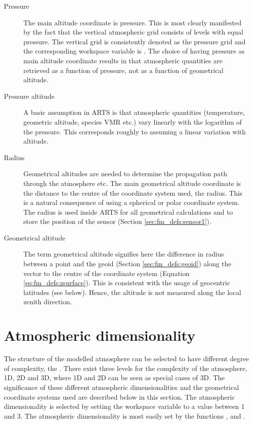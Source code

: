 \begin{description}
  
\item[Pressure] The main altitude coordinate is
  pressure. This is most clearly manifested by the fact that the
  vertical atmospheric grid consists of levels with equal pressure.
  The vertical grid is consistently denoted as the pressure grid and
  the corresponding workspace variable is . The
  choice of having pressure as main altitude coordinate results in
  that atmospheric quantities are retrieved as a function of pressure,
  not as a function of geometrical altitude.
  
\item[Pressure altitude] A basic assumption
  in ARTS is that atmospheric quantities (temperature, geometric
  altitude, species VMR etc.) vary linearly with the logarithm of the
  pressure. This corresponds roughly to assuming a linear variation
  with altitude. 

\item[Radius] Geometrical altitudes are
  needed to determine the propagation path through the atmosphere etc.
  The main geometrical altitude coordinate is the distance to the
  centre of the coordinate system used, the radius. This is a natural
  consequence of using a spherical or polar coordinate system. The
  radius is used inside ARTS for all geometrical calculations and to
  store the position of the sensor (Section 
  \ref{sec:fm_defs:sensor1}).
  
\item[Geometrical altitude] The term geometrical
  altitude signifies here the difference in radius between a point and the
  geoid (Section \ref{sec:fm_defs:geoid}) along the vector to the centre of the
  coordinate system (Equation \ref{eq:fm_defs:zsurface}). This is consistent
  with the usage of geocentric latitudes (see below). Hence, the altitude is
  not measured along the local zenith direction.
\end{description}



\section{Atmospheric dimensionality}
\label{sec:fm_defs:atmdim}

The structure of the modelled atmosphere can be selected to have different
degree of complexity, the . There exist
three levels for the complexity of the atmosphere, 1D, 2D and 3D, where 1D and
2D can be seen as special cases of 3D. The significance of these different
atmospheric dimensionalities and the geometrical coordinate systems used
are described below in this section. The atmospheric dimensionality is selected
by setting the workspace variable  to a value between
1 and 3. The atmospheric dimensionality is most easily set by the functions
,  and
.

